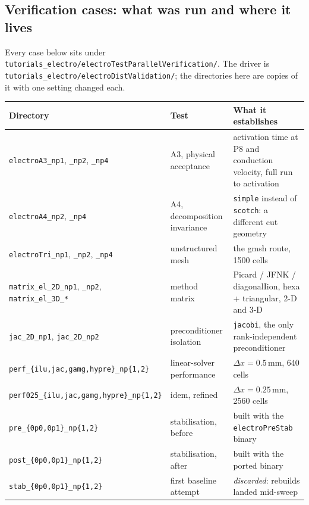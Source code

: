 \documentclass[11pt,a4paper]{article}
\newcommand{\code}[1]{\texttt{\small #1}}
\begin{document}

\subsection{Verification cases: what was run and where it lives}
\label{sec:elec-parverif-cases}

Every case below sits under
\code{tutorials\_electro/electroTestParallelVerification/}. The driver is
\code{tutorials\_electro/electroDistValidation/}; the directories here are
copies of it with one setting changed each.

\begin{center}
\begin{tabular}{@{}llp{6.2cm}@{}}
\toprule
Directory & Test & What it establishes \\
\midrule
\code{electroA3\_np1}, \code{\_np2}, \code{\_np4}
  & A3, physical acceptance
  & activation time at P8 and conduction velocity, full run to activation \\
\code{electroA4\_np2}, \code{\_np4}
  & A4, decomposition invariance
  & \code{simple} instead of \code{scotch}: a different cut geometry \\
\code{electroTri\_np1}, \code{\_np2}, \code{\_np4}
  & unstructured mesh
  & the gmsh route, 1500 cells \\
\code{matrix\_el\_2D\_np1}, \code{\_np2}, \code{matrix\_el\_3D\_*}
  & method matrix
  & Picard / JFNK / diagonalIion, hexa + triangular, 2-D and 3-D \\
\code{jac\_2D\_np1}, \code{jac\_2D\_np2}
  & preconditioner isolation
  & \code{jacobi}, the only rank-independent preconditioner \\
\code{perf\_\{ilu,jac,gamg,hypre\}\_np\{1,2\}}
  & linear-solver performance
  & $\Delta x = 0.5$\,mm, 640 cells \\
\code{perf025\_\{ilu,jac,gamg,hypre\}\_np\{1,2\}}
  & idem, refined
  & $\Delta x = 0.25$\,mm, 2560 cells \\
\code{pre\_\{0p0,0p1\}\_np\{1,2\}}
  & stabilisation, before
  & built with the \code{electroPreStab} binary \\
\code{post\_\{0p0,0p1\}\_np\{1,2\}}
  & stabilisation, after
  & built with the ported binary \\
\code{stab\_\{0p0,0p1\}\_np\{1,2\}}
  & first baseline attempt
  & \emph{discarded}: rebuilds landed mid-sweep \\
\bottomrule
\end{tabular}
\end{center}
\end{document}
